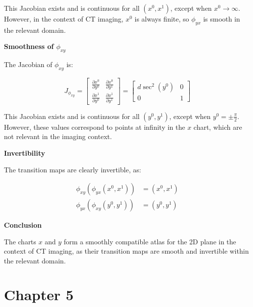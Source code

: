 \documentclass{article}
\begin{document}
This Jacobian exists and is continuous for all $(x^0, x^1)$, except when $x^0 \to \infty$. However, in the context of CT imaging, $x^0$ is always finite, so $\phi_{yx}$ is smooth in the relevant domain.

\textbf{Smoothness of $\phi_{xy}$}

The Jacobian of $\phi_{xy}$ is:

\[
J_{\phi_{xy}} = \begin{bmatrix}
\frac{\partial x^0}{\partial y^0} & \frac{\partial x^0}{\partial y^1} \\
\frac{\partial x^1}{\partial y^0} & \frac{\partial x^1}{\partial y^1}
\end{bmatrix}
= \begin{bmatrix}
d \sec^2(y^0) & 0 \\
0 & 1
\end{bmatrix}
\]

This Jacobian exists and is continuous for all $(y^0, y^1)$, except when $y^0 = \pm \frac{\pi}{2}$. However, these values correspond to points at infinity in the $x$ chart, which are not relevant in the imaging context.

\textbf{Invertibility}

The transition maps are clearly invertible, as:

\begin{align*}
\phi_{xy}(\phi_{yx}(x^0, x^1)) &= (x^0, x^1) \\
\phi_{yx}(\phi_{xy}(y^0, y^1)) &= (y^0, y^1)
\end{align*}

\textbf{Conclusion}

The charts $x$ and $y$ form a smoothly compatible atlas for the 2D plane in the context of CT imaging, as their transition maps are smooth and invertible within the relevant domain.

\newpage
\section{Chapter 5}
\end{document}
